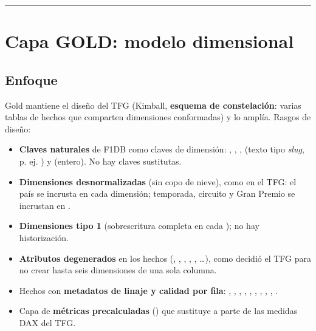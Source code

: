 \medskip\noindent\textcolor{muted!40}{\rule{\linewidth}{0.3pt}}\medskip

\section{Capa GOLD: modelo dimensional}

\subsection{Enfoque}

Gold mantiene el diseño del TFG (Kimball, \textbf{esquema de constelación}: varias tablas de hechos que comparten dimensiones conformadas) y lo amplía. Rasgos de diseño:

\begin{itemize}
\item \textbf{Claves naturales} de F1DB como claves de dimensión: , , ,  (texto tipo \emph{slug}, p. ej. ) y  (entero). No hay claves sustitutas.
\item \textbf{Dimensiones desnormalizadas} (sin copo de nieve), como en el TFG: el país se incrusta en cada dimensión; temporada, circuito y Gran Premio se incrustan en .
\item \textbf{Dimensiones tipo 1} (sobrescritura completa en cada ); no hay historización.
\item \textbf{Atributos degenerados} en los hechos (, , , , , …), como decidió el TFG para no crear hasta seis dimensiones de una sola columna.
\item Hechos con \textbf{metadatos de linaje y calidad por fila}: , , , , , , , , , .
\item Capa de \textbf{métricas precalculadas} () que sustituye a parte de las medidas DAX del TFG.
\end{itemize}

